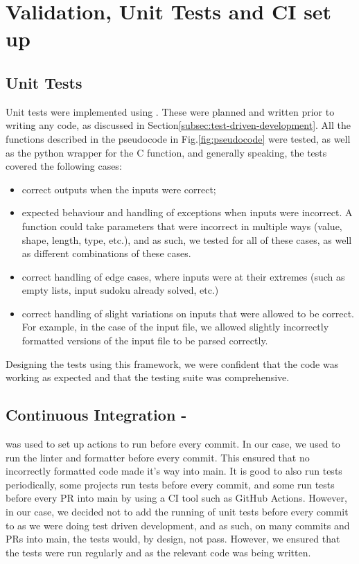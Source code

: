 
\section{Validation, Unit Tests and CI set up}\label{sec:validation-unit-tests-and-ci-set-up}
    \subsection{Unit Tests}\label{subsec:validation}
    Unit tests were implemented using .
    These were planned and written prior to writing any code, as discussed in Section\eqref{subsec:test-driven-development}.
    All the functions described in the pseudocode in Fig.\eqref{fig:pseudocode} were tested, as well as the python wrapper
    for the  C function, and generally speaking, the tests covered the following cases:
    \begin{itemize}
        \item correct outputs when the inputs were correct;
        \item expected behaviour and handling of exceptions when inputs were incorrect.
        A function could take parameters that were incorrect in multiple ways (value, shape, length, type, etc.), and as such,
        we tested for all of these cases, as well as different combinations of these cases.
        \item correct handling of edge cases, where inputs were at their extremes (such as empty lists, input
        sudoku already solved, etc.)
        \item correct handling of slight variations on inputs that were allowed to be correct.
        For example, in the case of the input file, we allowed slightly incorrectly formatted versions of the input file
        to be parsed correctly.
    \end{itemize}

    Designing the tests using this framework, we were confident that the code was working as expected and that the testing
    suite was comprehensive.

    \subsection{Continuous Integration - }\label{subsec:continuous-integration}
     was used to set up actions to run before every commit.
    In our case, we used  to run the  linter and formatter before every commit.
    This ensured that no incorrectly formatted code made it's way into main.
    It is good to also run tests periodically, some projects run tests before every commit, and some run tests before
    every PR into main by using a CI tool such as GitHub Actions.
    However, in our case, we decided not to add the running of unit tests before every commit to
     as we were doing test driven development, and as such, on many commits
    and PRs into main, the tests would, by design, not pass.
    However, we ensured that the tests were run regularly and as the relevant code was being written.
